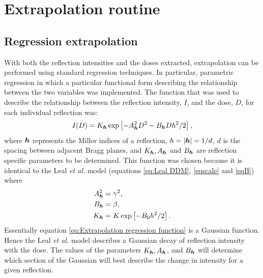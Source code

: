 \section{Extrapolation routine}
\label{sec:Extrapolation routine}

\subsection{Regression extrapolation}
\label{sub:Regression extrapolation}
With both the reflection intensities and the doses extracted, extrapolation can be performed using standard regression techniques.
In particular, parametric regression in which a particular functional form describing the relationship between the two variables was implemented.
The function that was used to describe the relationship between the reflection intensity, $I$, and the dose, $D$, for each individual reflection was:
\begin{equation}
    I(D) = K_{\boldsymbol{h}} \exp \left[- A^2_{\boldsymbol{h}}D^2 - B_{\boldsymbol{h}}D h^2/2 \right],
    \label{eq:Extrapolation regression function}
\end{equation}
where $\boldsymbol{h}$ represents the Miller indices of a reflection, $h = |\boldsymbol{h}| = 1/d$, $d$ is the spacing between adjacent Bragg planes, and $K_{\boldsymbol{h}}, A_{\boldsymbol{h}}$ and $B_{\boldsymbol{h}}$ are reflection specific parameters to be determined.
This function was chosen because it is identical to the Leal \textit{et al.} model (equations \ref{eq:Leal DDM}, \ref{eqscale} and \ref{eqB}) where
\begin{align}
    A^2_{\boldsymbol{h}} &= \gamma^2, \\
    B_{\boldsymbol{h}} &= \beta, \\
    K_{\boldsymbol{h}} &= K\exp \left[ -B_0 h^2/2 \right].
\end{align}
Essentially equation \ref{eq:Extrapolation regression function} is a Gaussian function.
Hence the Leal \textit{et al.} model describes a Gaussian decay of reflection intensity with the dose.
The values of the parameters $K_{\boldsymbol{h}}, A_{\boldsymbol{h}}$, and $B_{\boldsymbol{h}}$ will determine which section of the Gaussian will best describe the change in intensity for a given reflection.

